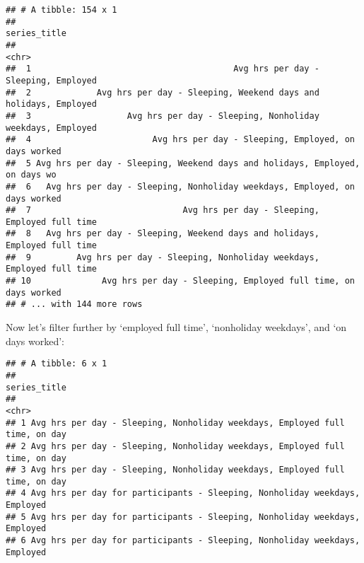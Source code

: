 \documentclass[]{book}
\newenvironment{Shaded}{\begin{snugshade}}{\end{snugshade}}
\newcommand{\KeywordTok}[1]{\textcolor[rgb]{0.13,0.29,0.53}{\textbf{{#1}}}}
\newcommand{\DataTypeTok}[1]{\textcolor[rgb]{0.13,0.29,0.53}{{#1}}}
\newcommand{\StringTok}[1]{\textcolor[rgb]{0.31,0.60,0.02}{{#1}}}
\newcommand{\OtherTok}[1]{\textcolor[rgb]{0.56,0.35,0.01}{{#1}}}
\newcommand{\NormalTok}[1]{{#1}}
\theoremstyle{definition}
\theoremstyle{definition}
\theoremstyle{remark}
\begin{document}
\begin{verbatim}
## # A tibble: 154 x 1
##                                                                   series_title
##                                                                          <chr>
##  1                                        Avg hrs per day - Sleeping, Employed
##  2             Avg hrs per day - Sleeping, Weekend days and holidays, Employed
##  3                   Avg hrs per day - Sleeping, Nonholiday weekdays, Employed
##  4                        Avg hrs per day - Sleeping, Employed, on days worked
##  5 Avg hrs per day - Sleeping, Weekend days and holidays, Employed, on days wo
##  6   Avg hrs per day - Sleeping, Nonholiday weekdays, Employed, on days worked
##  7                              Avg hrs per day - Sleeping, Employed full time
##  8   Avg hrs per day - Sleeping, Weekend days and holidays, Employed full time
##  9         Avg hrs per day - Sleeping, Nonholiday weekdays, Employed full time
## 10              Avg hrs per day - Sleeping, Employed full time, on days worked
## # ... with 144 more rows
\end{verbatim}

Now let's filter further by `employed full time', `nonholiday weekdays',
and `on days worked':

\begin{Shaded}
\end{Shaded}

\begin{verbatim}
## # A tibble: 6 x 1
##                                                                  series_title
##                                                                         <chr>
## 1 Avg hrs per day - Sleeping, Nonholiday weekdays, Employed full time, on day
## 2 Avg hrs per day - Sleeping, Nonholiday weekdays, Employed full time, on day
## 3 Avg hrs per day - Sleeping, Nonholiday weekdays, Employed full time, on day
## 4 Avg hrs per day for participants - Sleeping, Nonholiday weekdays, Employed 
## 5 Avg hrs per day for participants - Sleeping, Nonholiday weekdays, Employed 
## 6 Avg hrs per day for participants - Sleeping, Nonholiday weekdays, Employed
\end{verbatim}
\end{document}
